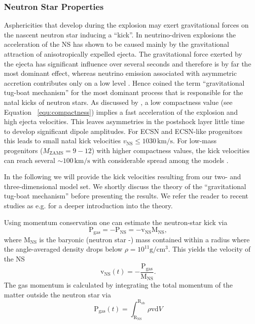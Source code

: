 \documentclass[fleqn,usenatbib]{mnras}
\newcommand{\ud}{\ensuremath{\mathrm{d}}}
\newcommand{\kms}{\ensuremath{\mathrm{km/s}}\xspace}
\begin{document}
\subsubsection{Neutron Star Properties}
\label{sec:Neutron Star Properties}
Asphericities that develop during the explosion may exert gravitational forces on the nascent neutron star inducing a ``kick''. In neutrino-driven explosions the acceleration of the NS has shown to be caused mainly by the gravitational attraction of anisotropically expelled ejecta. The gravitational force exerted by the ejecta has significant influence over several seconds and therefore is by far the most dominant effect, whereas neutrino emission associated with asymmetric accretion contributes only on a low level  \cite{Janka2017}.
Hence \citet{Wongwathanarat2013} coined the term ``gravitational tug-boat mechanism'' for the most dominant process that is responsible for the natal kicks of neutron stars. 
As discussed by \citet{Janka2017}, a low compactness value (see Equation ~\ref{equ:compactness}) implies a fast acceleration of the explosion and high ejecta velocities. This leaves asymmetries in the postshock layer little time to develop significant dipole amplitudes. 
For ECSN and ECSN-like progenitors this leads to small natal kick velocities $v_{\mathrm{NS}}\leq 10\mathrm{30}\,\kms$.
For low-mass progenitors ($M_{\mathrm{ZAMS}}=9-12$) with higher compactness values, the kick velocities can reach several $\sim 100 \,\kms$ with considerable spread among the models \cite{Scheck2006,Mueller2019,Nakamura2019}.

In the following we will provide the kick velocities resulting from our two- and three-dimensional model set. We shortly discuss the theory of the ``gravitational tug-boat mechanism'' before presenting the results. We refer the reader to recent studies as e.g. \citealt{Scheck2006,Wongwathanarat2013,Janka2017,Gessner2018,Mueller2019} for a deeper introduction into the theory.

Using momentum conservation one can estimate the neutron-star kick via
\begin{equation}
  \pmb{\mathrm{P}}_{\mathrm{gas}} = - \pmb{\mathrm{P}}_{\mathrm{NS}} = - \pmb{\mathrm{v}}_{\mathrm{NS}}\mathrm{M_{NS}},
\end{equation}
where $\mathrm{M_{NS}}$ is the baryonic (neutron star -) mass contained within a radius where the angle-averaged density drops below $\rho = 10^{11} \mathrm{g/cm^3}$. This yields the velocity of the NS
\begin{equation}
  \pmb{\mathrm{v}}_{\mathrm{NS}}(t) = - \frac{\pmb{\mathrm{P}}_{\mathrm{gas}}}{ \mathrm{M_{NS}}}.
  \label{equ:momentum_kick}
\end{equation}
The gas momentum is calculated by integrating the total momentum of the matter outside the neutron star via
\begin{equation}
    \label{equ:pz}
  \pmb{\mathrm{P}}_{\mathrm{gas}} (t) = \int_{\mathrm{R_{NS}}}^{\mathrm{R_{ob}}} \rho \pmb{\mathrm{v}} \ud V
\end{equation}
\end{document}

